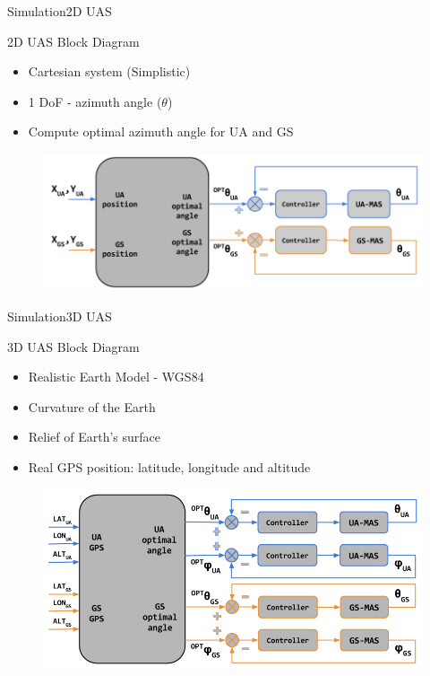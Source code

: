 \begin{frame}{Simulation}{2D UAS}
	\begin{block}{2D UAS Block Diagram}
		\begin{itemize}
		  	\item Cartesian system (Simplistic)
		  	\item 1 DoF - azimuth angle ($\theta$)
		  	\item Compute optimal azimuth angle for UA and GS 
		\end{itemize}

		\begin{figure}
	        \includegraphics[scale=0.32]{figures/2D_system.png}
	    \end{figure}
    \end{block}
\end{frame}

\begin{frame}{Simulation}{3D UAS}
  \begin{block}{3D UAS Block Diagram}
	\begin{itemize}
	  	\item Realistic Earth Model - WGS84
	  	\item Curvature of the Earth
	  	\item Relief of Earth's surface 
	  	\item Real GPS position: latitude, longitude and altitude
	\end{itemize}

	\begin{figure}
		\includegraphics[scale=0.33]{figures/3D_system.png}
	\end{figure}
  \end{block}
\end{frame}
